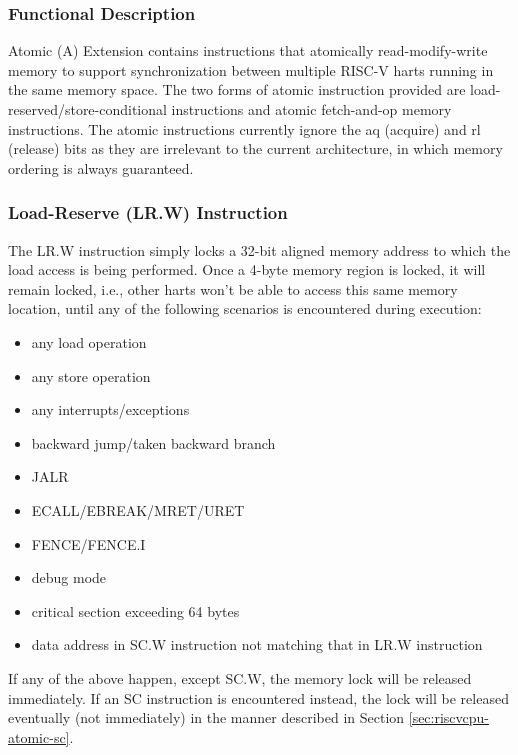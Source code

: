 \documentclass[main\_\_EN.tex]{subfiles}
\begin{document}
\subsubsection{Functional Description}
\label{sec:riscvcpu-atomic-func-descr}

Atomic (A) Extension contains instructions that atomically read-modify-write memory to support synchronization between multiple RISC-V harts running in the same memory space. The two forms of atomic instruction provided are load-reserved/store-conditional instructions and atomic fetch-and-op memory instructions. The atomic instructions currently ignore the aq (acquire) and rl (release) bits as they are irrelevant to the current architecture, in which memory ordering is always guaranteed.

\subsubsection{Load-Reserve (LR.W) Instruction}
\label{sec:riscvcpu-atomic-lr}

The LR.W instruction simply locks a 32-bit aligned memory address to which the load access is being performed. Once a 4-byte memory region is locked, it will remain locked, i.e., other harts won't be able to access this same memory location, until any of the following scenarios is encountered during execution:

\begin{itemize}
    \item any load operation
    \item any store operation
    \item any interrupts/exceptions
    \item backward jump/taken backward branch
    \item JALR
    \item ECALL/EBREAK/MRET/URET
    \item FENCE/FENCE.I
    \item debug mode
    \item critical section exceeding 64 bytes
    \item data address in SC.W instruction not matching that in LR.W instruction
\end{itemize}

If any of the above happen, except SC.W, the memory lock will be released immediately. If an SC instruction is encountered instead, the lock will be released eventually (not immediately) in the manner described in Section \ref{sec:riscvcpu-atomic-sc}.
\end{document}
